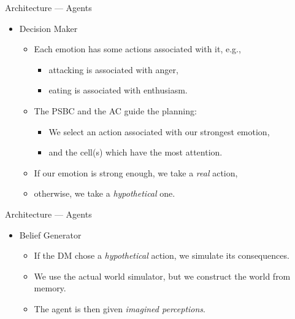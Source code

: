 \documentclass{beamer}
\def\tikzoverlay{%
   \tikz[baseline,overlay]\node[every overlay node]
}%
\begin{document}
   \begin{frame}{Architecture --- Agents}
      \begin{itemize}
         \item Decision Maker
            \begin{itemize}
               \item Each emotion has some actions associated with it, e.g.,
               \begin{itemize}
                  \item attacking is associated with anger,
                  \item eating is associated with enthusiasm.
               \end{itemize}
               \pause
               \item The PSBC and the AC guide the planning:
               \begin{itemize}
                  \item We select an action associated with our strongest emotion,
                  \item and the cell(s) which have the most attention.
               \end{itemize}
               \pause
               \item If our emotion is strong enough, we take a \emph{real} action,
               \item otherwise, we take a \emph{hypothetical} one.
            \end{itemize}
      \end{itemize}
      
   \end{frame}
   
   \begin{frame}{Architecture --- Agents}
      \begin{itemize}
         \item Belief Generator
         \begin{itemize}
            \item If the DM chose a \emph{hypothetical} action, we simulate its consequences.
            \item We use the actual world simulator, but we construct the world from memory.
            \item The agent is then given \emph{imagined perceptions}.
         \end{itemize}
      \end{itemize}
      
   \end{frame}
   
\end{document}
